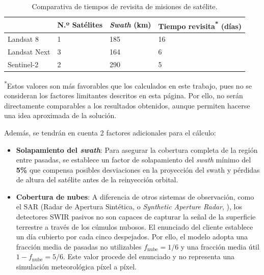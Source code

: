 \begin{table}[H]
\caption{Comparativa de tiempos de revisita de misiones de satélite.}
\centering
\begin{tabular}{@{}llll@{}}
\toprule
             & N.º Satélites & \textit{Swath} (km) & Tiempo revisita\textsuperscript{*} (días) \\ \midrule
Landsat 8 \cite{li2020global}   & 1                & 185                 & 16                     \\
Landsat Next \cite{neigh2023landsat} & 3                & 164                 & 6                      \\
Sentinel-2  \cite{copernicus2025sentinel} & 2                & 290                 & 5                      \\ \bottomrule
\end{tabular}
\par\smallskip
\noindent\textsuperscript{*}\footnotesize Estos valores son más favorables que los calculados en este trabajo, pues no se consideran los factores limitantes descritos en esta página. Por ello, no serán directamente comparables a los resultados obtenidos, aunque permiten hacerse una idea aproximada de la solución.

\label{tab:revisitlandsat}
\end{table}


Además, se tendrán en cuenta 2 factores adicionales para el cálculo:
\begin{itemize}
    \item \textbf{Solapamiento del \textit{swath}}: Para asegurar la cobertura completa de la región entre pasadas, se establece un factor de solapamiento del \textit{swath} mínimo del \textbf{5\%} que compensa posibles desviaciones en la proyección del swath y pérdidas de altura del satélite antes de la reinyección orbital.
    \item \textbf{Cobertura de nubes}: A diferencia de otros sistemas de observación, como el SAR (Radar de Apertura Sintética, o \textit{Synthetic Aperture Radar}, \cite{lou2020sar}), los detectores SWIR pasivos no son capaces de capturar la señal de la superficie terrestre a través de los cúmulos nubosos. El enunciado del cliente establece un día cubierto por cada cinco despejados. Por ello, el modelo adopta una fracción media de pasadas no utilizables $f_{\mathrm{nube}}=1/6$ y una fracción media útil $1-f_{\mathrm{nube}}=5/6$. Este valor procede del enunciado y no representa una simulación meteorológica píxel a píxel.
\end{itemize}

